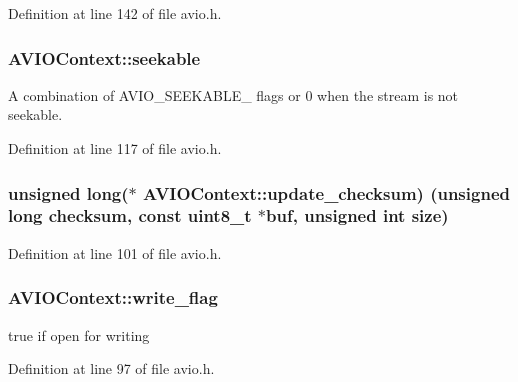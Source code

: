 Definition at line 142 of file avio.\+h.

\subsubsection[{\texorpdfstring{seekable}{seekable}}]{ A\+V\+I\+O\+Context\+::seekable}\hypertarget{struct_a_v_i_o_context_a0e3c41c290b38923880b9cccb669bf78}{}\label{struct_a_v_i_o_context_a0e3c41c290b38923880b9cccb669bf78}
A combination of A\+V\+I\+O\+\_\+\+S\+E\+E\+K\+A\+B\+L\+E\+\_\+ flags or 0 when the stream is not seekable. 

Definition at line 117 of file avio.\+h.

\subsubsection[{\texorpdfstring{update\+\_\+checksum}{update_checksum}}]{\setlength{\rightskip}{0pt plus 5cm}unsigned long($\ast$ A\+V\+I\+O\+Context\+::update\+\_\+checksum) (unsigned long {\bf checksum}, {\bf const} {\bf uint8\+\_\+t} $\ast${\bf buf}, unsigned {\bf int} {\bf size})}\hypertarget{struct_a_v_i_o_context_a7ff26703ccfb39cdd38fd49f5a95796c}{}\label{struct_a_v_i_o_context_a7ff26703ccfb39cdd38fd49f5a95796c}


Definition at line 101 of file avio.\+h.

\subsubsection[{\texorpdfstring{write\+\_\+flag}{write_flag}}]{ A\+V\+I\+O\+Context\+::write\+\_\+flag}\hypertarget{struct_a_v_i_o_context_aab6ff8baf51038f1557e817717baccba}{}\label{struct_a_v_i_o_context_aab6ff8baf51038f1557e817717baccba}
true if open for writing 

Definition at line 97 of file avio.\+h.

